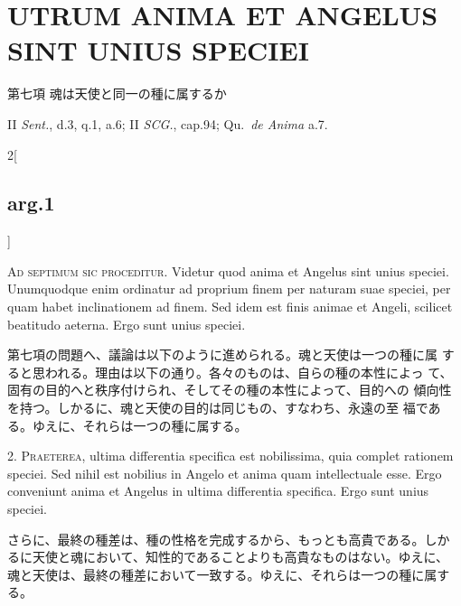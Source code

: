 \documentclass[paper=a4paper,fontsize=10pt,jafontsize=9pt,titlepage]{jlreq}
\begin{document}
\section{UTRUM ANIMA ET ANGELUS SINT UNIUS SPECIEI}

{\Large 第七項 魂は天使と同一の種に属するか}

{\footnotesize II {\itshape Sent.}, d.3, q.1, a.6; II {\itshape SCG.},
 cap.94; Qu.~{\itshape de Anima} a.7.}\\


\vspace{2em}
\begin{paracol}{2}[\subsection{arg.1}]

{\scshape Ad septimum sic proceditur}. Videtur quod anima et Angelus sint unius
 speciei. Unumquodque enim ordinatur ad proprium finem per naturam suae speciei,
 per quam habet inclinationem ad finem. Sed idem est finis animae et Angeli,
 scilicet beatitudo aeterna. Ergo sunt unius speciei.

\switchcolumn

 第七項の問題へ、議論は以下のように進められる。魂と天使は一つの種に属
 すると思われる。理由は以下の通り。各々のものは、自らの種の本性によっ
 て、固有の目的へと秩序付けられ、そしてその種の本性によって、目的への
 傾向性を持つ。しかるに、魂と天使の目的は同じもの、すなわち、永遠の至
 福である。ゆえに、それらは一つの種に属する。
 



2. {\scshape Praeterea}, ultima differentia specifica est nobilissima, quia
complet rationem speciei. Sed nihil est nobilius in Angelo et anima quam
intellectuale esse. Ergo conveniunt anima et Angelus in ultima differentia
specifica. Ergo sunt unius speciei.

\switchcolumn

さらに、最終の種差は、種の性格を完成するから、もっとも高貴である。しか
るに天使と魂において、知性的であることよりも高貴なものはない。ゆえに、
魂と天使は、最終の種差において一致する。ゆえに、それらは一つの種に属す
る。
 


\end{paracol}
\end{document}

